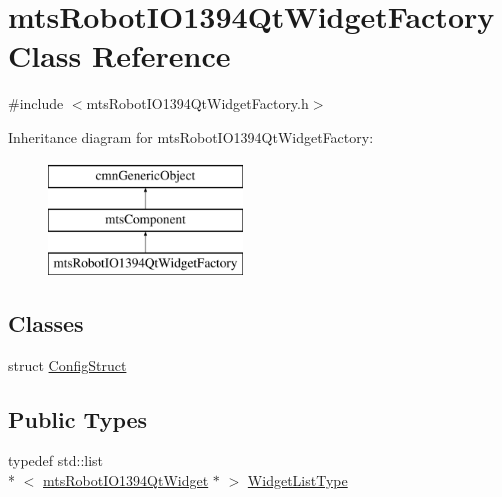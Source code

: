 \hypertarget{classmts_robot_i_o1394_qt_widget_factory}{\section{mts\-Robot\-I\-O1394\-Qt\-Widget\-Factory Class Reference}
\label{classmts_robot_i_o1394_qt_widget_factory}
}


{\ttfamily \#include $<$mts\-Robot\-I\-O1394\-Qt\-Widget\-Factory.\-h$>$}

Inheritance diagram for mts\-Robot\-I\-O1394\-Qt\-Widget\-Factory\-:\begin{figure}[H]
\begin{center}
\leavevmode
\includegraphics[height=3.000000cm]{d5/d69/classmts_robot_i_o1394_qt_widget_factory}
\end{center}
\end{figure}
\subsection*{Classes}
\begin{DoxyCompactItemize}
\item 
struct \hyperlink{structmts_robot_i_o1394_qt_widget_factory_1_1_config_struct}{Config\-Struct}
\end{DoxyCompactItemize}
\subsection*{Public Types}
\begin{DoxyCompactItemize}
\item 
typedef std\-::list\\*
$<$ \hyperlink{classmts_robot_i_o1394_qt_widget}{mts\-Robot\-I\-O1394\-Qt\-Widget} $\ast$ $>$ \hyperlink{classmts_robot_i_o1394_qt_widget_factory_aaa614e39fe48800dab4b21edf6845c22}{Widget\-List\-Type}
\end{DoxyCompactItemize}
